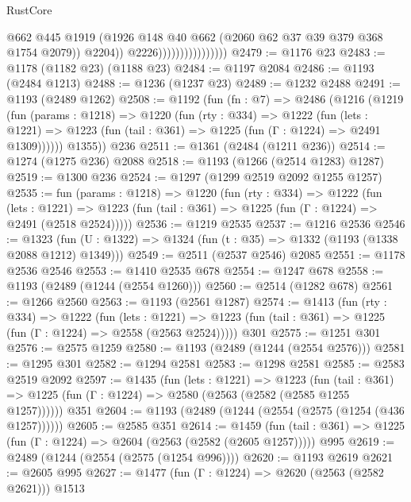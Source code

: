 \begin{lexlean}{RustCore}
\begin{coremodule}
                                        @662
                                        @445
                                        @1919
                                        (@1926
                                          @148
                                          @40
                                          @662
                                          (@2060 @62 @37 @39 @379 @368 @1754 @2079))
                                        @2204))
                                    @2226))))))))))))))))
@2479 := @1176 @23
@2483 := @1178 (@1182 @23) (@1188 @23)
@2484 := @1197 @2084
@2486 := @1193 (@2484 @1213)
@2488 := @1236 (@1237 @23)
@2489 := @1232 @2488
@2491 := @1193 (@2489 @1262)
@2508 := @1192
    (fun (fn : @7) =>
    @2486
      (@1216
        (@1219
          (fun (params : @1218) =>
          @1220
            (fun (rty : @334) =>
            @1222
              (fun (lets : @1221) =>
              @1223 (fun (tail : @361) => @1225 (fun (Γ : @1224) => @2491 @1309))))))
        @1355))
    @236
@2511 := @1361 (@2484 (@1211 @236))
@2514 := @1274 (@1275 @236) @2088
@2518 := @1193 (@1266 (@2514 @1283) @1287)
@2519 := @1300 @236
@2524 := @1297 (@1299 @2519 @2092 @1255 @1257)
@2535 := fun (params : @1218) =>
  @1220
    (fun (rty : @334) =>
    @1222
      (fun (lets : @1221) =>
      @1223 (fun (tail : @361) => @1225 (fun (Γ : @1224) => @2491 (@2518 @2524)))))
@2536 := @1219 @2535
@2537 := @1216 @2536
@2546 := @1323 (fun (U : @1322) => @1324 (fun (t : @35) => @1332 (@1193 (@1338 @2088 @1212) @1349)))
@2549 := @2511 (@2537 @2546) @2085
@2551 := @1178 @2536 @2546
@2553 := @1410 @2535 @678
@2554 := @1247 @678
@2558 := @1193 (@2489 (@1244 (@2554 @1260)))
@2560 := @2514 (@1282 @678)
@2561 := @1266 @2560
@2563 := @1193 (@2561 @1287)
@2574 := @1413
    (fun (rty : @334) =>
    @1222
      (fun (lets : @1221) =>
      @1223 (fun (tail : @361) => @1225 (fun (Γ : @1224) => @2558 (@2563 @2524)))))
    @301
@2575 := @1251 @301
@2576 := @2575 @1259
@2580 := @1193 (@2489 (@1244 (@2554 @2576)))
@2581 := @1295 @301
@2582 := @1294 @2581
@2583 := @1298 @2581
@2585 := @2583 @2519 @2092
@2597 := @1435
    (fun (lets : @1221) =>
    @1223
      (fun (tail : @361) => @1225 (fun (Γ : @1224) => @2580 (@2563 (@2582 (@2585 @1255 @1257))))))
    @351
@2604 := @1193 (@2489 (@1244 (@2554 (@2575 (@1254 (@436 @1257))))))
@2605 := @2585 @351
@2614 := @1459
    (fun (tail : @361) => @1225 (fun (Γ : @1224) => @2604 (@2563 (@2582 (@2605 @1257)))))
    @995
@2619 := @2489 (@1244 (@2554 (@2575 (@1254 @996))))
@2620 := @1193 @2619
@2621 := @2605 @995
@2627 := @1477 (fun (Γ : @1224) => @2620 (@2563 (@2582 @2621))) @1513

\end{coremodule}
\end{lexlean}
